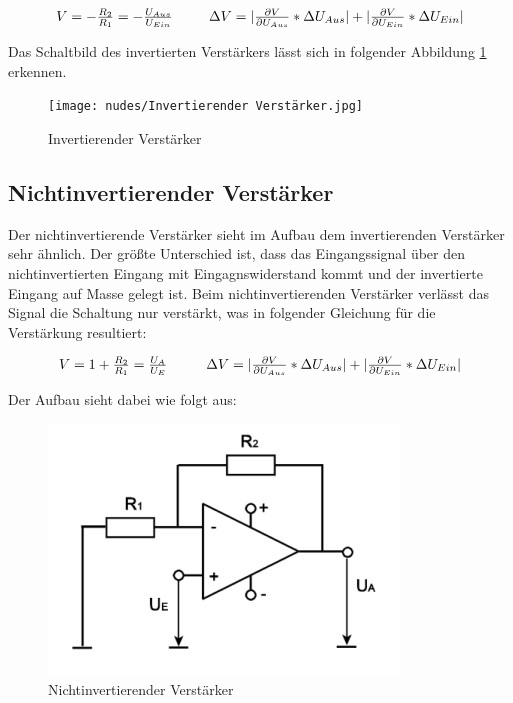 \documentclass[12pt,a4paper,twoside]{article}
\begin{document}
\begin{equation}
    \label{eq:InvertierenderVerstärkerVerstärkung}
    \centerline{$V=-\frac{R_{2}}{R_{1}} = -\frac{U_{Aus}}{U_{Ein}}$ \\ $\Delta V = \vert \frac{\partial V}{\partial U_{Aus}} * \Delta U_{Aus} \vert + \vert \frac{\partial V}{\partial U_{Ein}} * \Delta U_{Ein} \vert $}
\end{equation}

\noindent
Das Schaltbild des invertierten Verstärkers lässt sich in folgender Abbildung \ref{fig:InvertierenderVerstärker} erkennen.

\begin{figure}[H]
    \centering
    \texttt{[image: nudes/Invertierender Verstärker.jpg]}
    \caption{Invertierender Verstärker \cite{teachcenter2}}
    \label{fig:InvertierenderVerstärker}
\end{figure}


\subsection{Nichtinvertierender Verstärker}

Der nichtinvertierende Verstärker sieht im Aufbau dem invertierenden Verstärker sehr ähnlich. Der größte Unterschied ist, dass das Eingangssignal über den nichtinvertierten Eingang mit Eingagnswiderstand kommt und der invertierte Eingang auf Masse gelegt ist.
Beim nichtinvertierenden Verstärker verlässt das Signal die Schaltung nur verstärkt, was in folgender Gleichung für die Verstärkung resultiert:

\begin{equation}
    \label{eq:NichtinvertierenderVerstärkerVerstärkung}
    \centerline{$V=1 + \frac{R_{2}}{R_{1}} = \frac{U_{A}}{U_{E}}$  \\ $\Delta V = \vert \frac{\partial V}{\partial U_{Aus}} * \Delta U_{Aus} \vert + \vert \frac{\partial V}{\partial U_{Ein}} * \Delta U_{Ein} \vert $}
\end{equation}

\noindent
Der Aufbau sieht dabei wie folgt aus:

\begin{figure}[H]
    \centering
    \includegraphics[width=0.3\linewidth]{nudes/Nichtinvertierender Verstärker.jpg}
    \caption{Nichtinvertierender Verstärker \cite{teachcenter2}}
    \label{fig:NichtInvertierenderVerstärker}
\end{figure}
\end{document}

